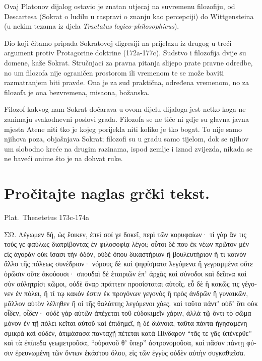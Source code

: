 Ovaj Platonov dijalog ostavio je znatan utjecaj na suvremenu filozofiju, od Descartesa (Sokrat o ludilu u raspravi o znanju kao percepciji) do Wittgensteina (u nekim tezama iz djela \textit{Tractatus logico-philosophicus}).

Dio koji čitamo pripada Sokratovoj digresiji na prijelazu iz drugog u treći argument protiv Protagorine doktrine (172a-177c). Sudstvo i filozofija dvije su domene, kaže Sokrat. Stručnjaci za pravna pitanja slijepo prate pravne odredbe, no um filozofa nije ograničen prostorom ili vremenom te se može baviti razmatranjem biti pravde. Ona je za sud praktična, određena vremenom, no za filozofa je ona bezvremena, misaona, božanska. 

Filozof kakvog nam Sokrat dočarava u ovom dijelu dijaloga jest netko koga ne zanimaju svakodnevni poslovi grada. Filozofa se ne tiče ni gdje su glavna javna mjesta Atene niti tko je kojeg porijekla niti koliko je tko bogat. To nije samo njihova poza, objašnjava Sokrat; filozofi su u gradu samo tijelom, dok se njihov um slobodno kreće na drugim razinama, ispod zemlje i iznad zvijezda, nikada se ne baveći onime što je na dohvat ruke.


\newpage

\section*{Pročitajte naglas grčki tekst.}

Plat.\ Theaetetus 173c-174a


\medskip


{\large

\begin{greek}

\noindent ΣΩ. Λέγωμεν δή, ὡς ἔοικεν, ἐπεὶ σοί γε δοκεῖ, περὶ τῶν κορυφαίων· τί γὰρ ἄν τις τούς γε φαύλως διατρίβοντας ἐν φιλοσοφίᾳ λέγοι; οὗτοι δέ που ἐκ νέων πρῶτον μὲν εἰς ἀγορὰν οὐκ ἴσασι τὴν ὁδόν, οὐδὲ ὅπου δικαστήριον ἢ βουλευτήριον ἤ τι κοινὸν ἄλλο τῆς πόλεως συνέδριον· νόμους δὲ καὶ ψηφίσματα λεγόμενα ἢ γεγραμμένα οὔτε ὁρῶσιν οὔτε ἀκούουσι· σπουδαὶ δὲ ἑταιριῶν ἐπʼ ἀρχὰς καὶ σύνοδοι καὶ δεῖπνα καὶ σὺν αὐλητρίσι κῶμοι, οὐδὲ ὄναρ πράττειν προσίσταται αὐτοῖς. εὖ δὲ ἢ κακῶς τις γέγονεν ἐν πόλει, ἤ τί τῳ κακόν ἐστιν ἐκ προγόνων γεγονὸς ἢ πρὸς ἀνδρῶν ἢ γυναικῶν, μᾶλλον αὐτὸν λέληθεν ἢ οἱ τῆς θαλάττης λεγόμενοι χόες. καὶ ταῦτα πάντʼ οὐδʼ ὅτι οὐκ οἶδεν, οἶδεν· οὐδὲ γὰρ αὐτῶν ἀπέχεται τοῦ εὐδοκιμεῖν χάριν, ἀλλὰ τῷ ὄντι τὸ σῶμα μόνον ἐν τῇ πόλει κεῖται αὐτοῦ καὶ ἐπιδημεῖ, ἡ δὲ διάνοια, ταῦτα πάντα ἡγησαμένη σμικρὰ καὶ οὐδέν, ἀτιμάσασα πανταχῇ πέτεται κατὰ Πίνδαρον ``τᾶς τε γᾶς ὑπένερθε'' καὶ τὰ ἐπίπεδα γεωμετροῦσα, ``οὐρανοῦ θʼ ὕπερ'' ἀστρονομοῦσα, καὶ πᾶσαν πάντῃ φύσιν ἐρευνωμένη τῶν ὄντων ἑκάστου ὅλου, εἰς τῶν ἐγγὺς οὐδὲν αὑτὴν συγκαθιεῖσα.

\end{greek}

}



